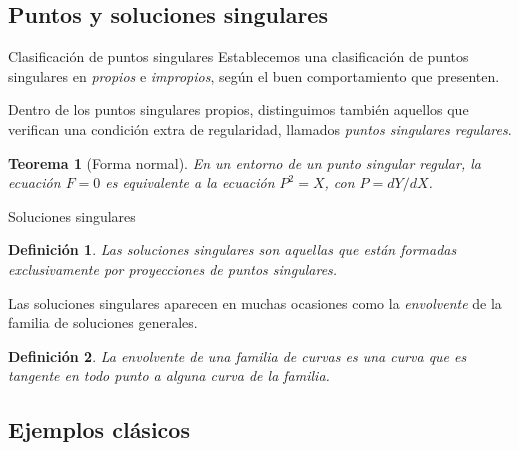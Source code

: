 \documentclass[10pt, spanish]{beamer}
\newtheorem{teorema}{Teorema}
\newtheorem{defi}{Definición}
\begin{document}
\subsection{Puntos y soluciones singulares}

\begin{frame}{Clasificación de puntos singulares}
  Establecemos una clasificación de puntos singulares en \textit{propios} e \textit{impropios}, según el buen comportamiento que presenten.
  \vspace{1em}

  Dentro de los puntos singulares propios, distinguimos también aquellos que verifican una condición extra de regularidad, llamados \textit{puntos singulares regulares}.
  \vspace{1em}
  \begin{teorema}[Forma normal]
    En un entorno de un punto singular regular, la ecuación $F=0$ es equivalente a la ecuación $P^2=X$, con $P=dY/dX$.
  \end{teorema}
\end{frame}

\begin{frame}{Soluciones singulares}
  \begin{defi}
    Las soluciones singulares son aquellas que están formadas exclusivamente por proyecciones de puntos singulares.
  \end{defi}

  Las soluciones singulares aparecen en muchas ocasiones como la \textit{envolvente} de la familia de soluciones generales.
  
  \vspace{0.5em}
  \begin{defi}
    La envolvente de una familia de curvas es una curva que es tangente en todo punto a alguna curva de la familia.
  \end{defi}
\end{frame}


\subsection{Ejemplos clásicos}
\end{document}
